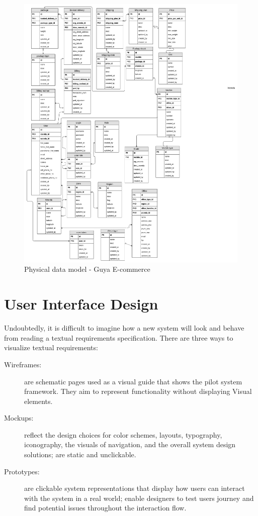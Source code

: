 \begin{figure}[!h]
\includegraphics[width=20cm, keepaspectratio]{images/xpress_database_diagram}
\caption{Physical data model - Guya E-commerce}
\end{figure}
\clearpage


\section{User Interface Design}
Undoubtedly, it is difficult to imagine how a new system will look and behave from reading a textual requirements specification. There are three ways to visualize textual requirements:
\begin{description}
	\item[Wireframes:] are schematic pages used as a visual guide that shows the pilot system framework. They aim to represent functionality without displaying Visual elements.
	\item[Mockups:] reflect the design choices for color schemes, layouts, typography, iconography, the visuals of navigation, and the overall system design solutions; are static and unclickable.
	\item[Prototypes:] are clickable system representations that display how users can interact with the system in a real world; enable designers to test users journey and find potential issues throughout the interaction flow.
\end{description}

